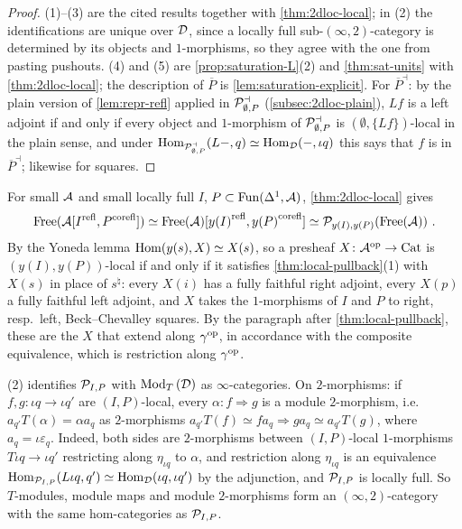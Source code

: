 \begin{proof}
%
(1)--(3) are the cited results together with \cref{thm:2dloc-local};
in (2) the identifications are unique over $\mathcal{D}$,
since a locally full sub-$(\infty,2)$-category is determined by its objects and
$1$-morphisms, so they agree with the one from pasting pushouts.
(4) and (5) are \cref{prop:saturation-L}(2) and \cref{thm:sat-units} with
\cref{thm:2dloc-local}; the description of $\overline{P}$ is
\cref{lem:saturation-explicit}. For
$\overline{P}^{\dashv}$:
by the plain version of \cref{lem:repr-refl} applied in
$\mathcal{P}^{\dashv}_{\emptyset,P}$
(\cref{subsec:2dloc-plain}), $Lf$ is a left adjoint if and only if every object
and $1$-morphism of
$\mathcal{P}^{\dashv}_{\emptyset,P}$
is $(\emptyset,\{Lf\})$-local in the plain sense, and under
$\operatorname{Hom}_{\mathcal{P}^{\dashv}_{\emptyset,P}}(L-,q) \simeq \operatorname{Hom}_{\mathcal{D}}(-,\iota q)$
this says that $f$ is in
$\overline{P}^{\dashv}$;
likewise for squares.
\end{proof}

\begin{rmk}
\label{rmk:free-local}
%
For small $\mathcal{A}$ and small locally full $I$,
$P \subset \operatorname{Fun}(\Delta^{1},\mathcal{A})$,
\cref{thm:2dloc-local} gives
\begin{equation*}
\operatorname{Free}(\mathcal{A}[{I}^{\mathrm{refl}},{P}^{\mathrm{corefl}}]) \simeq \operatorname{Free}(\mathcal{A})[{y(I)}^{\mathrm{refl}},{y(P)}^{\mathrm{corefl}}] \simeq
\mathcal{P}_{y(I),y(P)}(\operatorname{Free}(\mathcal{A})) \ .
\end{equation*}
By the Yoneda lemma
$\operatorname{Hom}(y(s),X) \simeq X(s)$,
so a presheaf
$X\colon \mathcal{A}^{\mathrm{op}} \to \mathrm{Cat}$
is $(y(I),y(P))$-local if and only if it satisfies \cref{thm:local-pullback}(1)
with $X(s)$ in place of $s^{\natural}$: every $X(i)$ has a fully faithful right
adjoint, every $X(p)$ a fully faithful left adjoint,
and $X$ takes the $1$-morphisms of $I$ and $P$ to right, resp.\ left,
Beck--Chevalley squares. By the paragraph after \cref{thm:local-pullback},
these are the $X$ that extend along $\gamma^{\mathrm{op}}$,
in accordance with the composite equivalence,
which is restriction along $\gamma^{\mathrm{op}}$.
\end{rmk}

\begin{rmk}
\label{rmk:eilenberg-moore-enriched}
%
(2) identifies $\mathcal{P}_{I,P}$ with ${\operatorname{Mod}_{T}\left(\mathcal{D}\right)}$ as
$\infty$-categories. On $2$-morphisms: if
$f,g\colon \iota q \to \iota q'$
are $(I,P)$-local, every
$\alpha\colon f \Rightarrow g$
is a module $2$-morphism, i.e.\
$a_{q'}T(\alpha) = \alpha a_{q}$
as $2$-morphisms
$a_{q'}T(f) \simeq fa_{q} \Rightarrow ga_{q} \simeq a_{q'}T(g)$,
where
$a_{q} = \iota\varepsilon_{q}$.
Indeed, both sides are $2$-morphisms between $(I,P)$-local $1$-morphisms
$T\iota q \to \iota q'$
restricting along $\eta_{\iota q}$ to $\alpha$,
and restriction along $\eta_{\iota q}$ is an equivalence
$\operatorname{Hom}_{\mathcal{P}_{I,P}}(L\iota q,q') \simeq \operatorname{Hom}_{\mathcal{D}}(\iota q,\iota q')$
by the adjunction, and $\mathcal{P}_{I,P}$ is locally full.
So $T$-modules,
module maps and module $2$-morphisms form an $(\infty,2)$-category with
the same hom-categories as $\mathcal{P}_{I,P}$.
\end{rmk}

